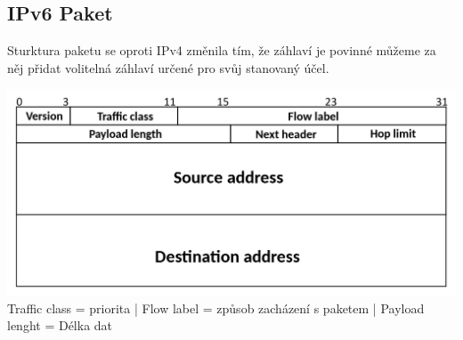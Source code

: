\subsection{IPv6 Paket}
Sturktura paketu se oproti IPv4 změnila tím, že záhlaví je povinné můžeme za něj přidat volitelná záhlaví určené pro svůj stanovaný účel.\\
\begin{center}
  \includegraphics[width=0.7\linewidth]{TVY-POS/IPv6-adresace/IPv6_paket.png}\\
  Traffic class = priorita | Flow label = způsob zacházení s paketem | Payload lenght = Délka dat
\end{center}
